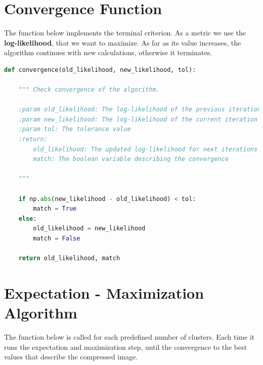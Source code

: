 \documentclass[11pt]{article}
\begin{document}
\section{Convergence Function}
The function below implements the terminal criterion. As a metric we use the \textbf{log-likelihood}, that we want to maximize. As far as its value increases, the algorithm continues with new calculations, otherwise it terminates.


\begin{lstlisting}[language = Python]
def convergence(old_likelihood, new_likelihood, tol):
    
    """ Check convergence of the algorithm.
    
    :param old_likelihood: The log-likelihood of the previous iteration
    :param new_likelihood: The log-likelihood of the current iteration
    :param tol: The tolerance value 
    :return:
        old_likelihood: The updated log-likelihood for next iterations
        match: The boolean variable describing the convergence
        
    """
    
    if np.abs(new_likelihood - old_likelihood) < tol:
        match = True
    else:
        old_likelihood = new_likelihood
        match = False
        
    return old_likelihood, match
    \end{lstlisting}
    
    \section{Expectation - Maximization Algorithm}
The function below is called for each predefined number of clusters. Each time it runs the expectation and maximization step, until the convergence to the best values that describe the compressed image.
\end{document}
